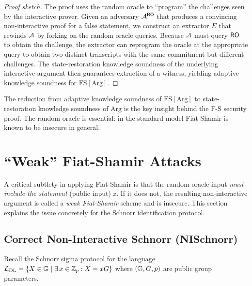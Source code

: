 \documentclass[11pt]{article}
\begin{document}
\begin{proof}[Proof sketch]
The proof uses the random oracle to ``program'' the challenges seen by the
interactive prover.  Given an adversary $\mathcal{A}^{\mathsf{RO}}$ that produces a convincing
non-interactive proof for a false statement, we construct an extractor $E$ that
rewinds $\mathcal{A}$ by forking on the random oracle queries.  Because $\mathcal{A}$ must
query $\mathsf{RO}$ to obtain the challenge, the extractor can reprogram the oracle at
the appropriate query to obtain two distinct transcripts with the same
commitment but different challenges.  The state-restoration knowledge soundness
of the underlying interactive argument then guarantees extraction of a witness,
yielding adaptive knowledge soundness for $\mathrm{FS}[\mathrm{Arg}]$.
\end{proof}

\begin{remark}
The reduction from adaptive knowledge soundness of $\mathrm{FS}[\mathrm{Arg}]$
to state-restoration knowledge soundness of $\mathrm{Arg}$ is the key insight
behind the F-S security proof.  The random oracle is essential: in the standard
model Fiat-Shamir is known to be insecure in general.
\end{remark}

\section{``Weak'' Fiat-Shamir Attacks}

A critical subtlety in applying Fiat-Shamir is that the random oracle input
\emph{must include the statement} (public input) $\mathbb{x}$.  If it does not,
the resulting non-interactive argument is called a \emph{weak Fiat-Shamir}
scheme and is insecure.  This section explains the issue concretely for the
Schnorr identification protocol.

\subsection{Correct Non-Interactive Schnorr (NISchnorr)}

Recall the Schnorr sigma protocol for the language
$\mathcal{L}_{\mathrm{DL}} = \{X \in \mathbb{G} \mid \exists\, x \in \mathbb{Z}_p : X = xG\}$
where $(\mathbb{G}, G, p)$ are public group parameters.
\end{document}
